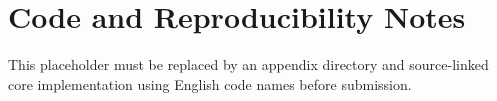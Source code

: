 \section{Code and Reproducibility Notes}
This placeholder must be replaced by an appendix directory and source-linked core implementation using English code names before submission.
